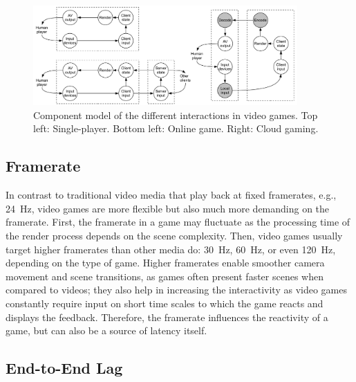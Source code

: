 
\begin{figure}[!t]
  \centering
  \includegraphics[width=0.9\textwidth]{../models/component_interaction_full.pdf}
  \caption{Component model of the different interactions in video games. Top left: Single-player. Bottom left: Online game. Right: Cloud gaming.}
  \label{fig:component-models}
\end{figure}

\subsection{Framerate}
\label{sec:framerate}

In contrast to traditional video media that play back at fixed 
framerates, e.g., \SI{24}{\hertz}, video games are more flexible 
but also much more demanding on the framerate. First, the framerate 
in a game may fluctuate as the processing time of the render process 
depends on the scene complexity.
Then, video games usually target higher framerates than other media do: 
\SI{30}{\hertz}, \SI{60}{\hertz}, or even \SI{120}{\hertz}, depending on 
the type of game. Higher framerates enable smoother camera movement and 
scene transitions, as games often present faster scenes when compared 
to videos; they also help in increasing the interactivity as video games 
constantly require input on short time scales to which the game reacts 
and displays the feedback. Therefore, the framerate 
influences the reactivity of a game, but can also be a source 
of latency itself.


\subsection{End-to-End Lag}\label{subsec:e2e-lag}

